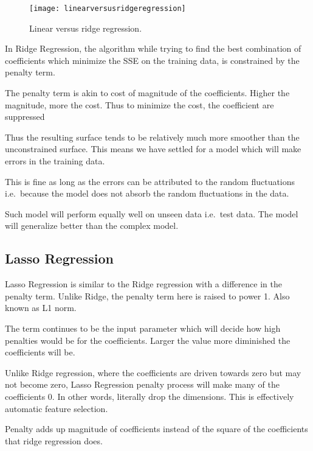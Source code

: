 	\begin{figure}[tbh]
		\centering
		\texttt{[image: linearversusridgeregression]}
		\caption{Linear versus ridge regression.}
		\label{fig:linearversusridgeregression}
	\end{figure}

	\begin{bulletedlist}
		\item In Ridge Regression, the algorithm while trying to find the best combination of coefficients which minimize the SSE on the training data, is constrained by the penalty term.
		\item The penalty term is akin to cost of magnitude of the coefficients. Higher the magnitude, more the cost. Thus to minimize the cost, the coefficient are suppressed
		\item Thus the resulting surface tends to be relatively much more smoother than the unconstrained surface. This means we have settled for a model which will make errors in the
training data.
		\item This is fine as long as the errors can be attributed to the random fluctuations i.e.\ because the model does not absorb the random fluctuations in the data.
		\item Such model will perform equally well on unseen data i.e.\ test data. The model will generalize better than the complex model.
	\end{bulletedlist}

	\subsection{Lasso Regression}

	\begin{bulletedlist}
		\item Lasso Regression is similar to the Ridge regression with a difference in the penalty term. Unlike Ridge, the penalty term here is raised to power 1. Also known as L1 norm.
		\item The term continues to be the input parameter which will decide how high penalties would be for the coefficients. Larger the value more diminished the coefficients will be.
		\item Unlike Ridge regression, where the coefficients are driven towards zero but may not become zero, Lasso Regression penalty process will make many of the coefficients 0. In other words, literally drop the dimensions.  This is effectively automatic feature selection.
		\item Penalty adds up magnitude of coefficients instead of the square of the coefficients that ridge regression does.
	\end{bulletedlist}

